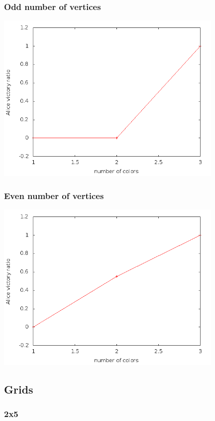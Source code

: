 \subsubsection{Odd number of vertices}

\includegraphics[width=11cm]{resultats/cycleimpair.png}

\subsubsection{Even number of vertices}

\includegraphics[width=11cm]{resultats/cyclepair.png}

\subsection{Grids}

\subsubsection{2x5}

